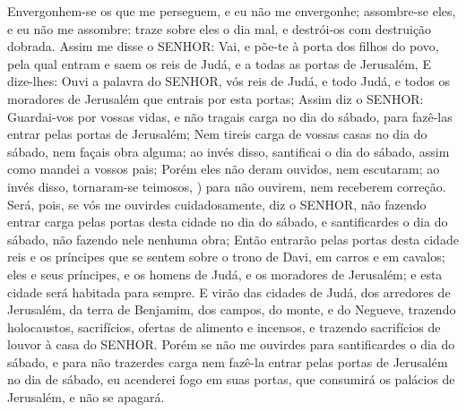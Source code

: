 {Envergonhem-se os que me perseguem, e eu não me envergonhe; assombre-se eles, e eu não me assombre: traze sobre eles o dia mal, e destrói-os com destruição dobrada.
Assim me disse o SENHOR: Vai, e põe-te à porta dos filhos do povo, pela qual entram e saem os reis de Judá, e a todas as portas de Jerusalém,
E dize-lhes: Ouvi a palavra do SENHOR, vós reis de Judá, e todo Judá, e todos os moradores de Jerusalém que entrais por esta portas;
Assim diz o SENHOR: Guardai-vos por vossas vidas,
 e não tragais carga no dia do sábado, para fazê-las entrar pelas portas de Jerusalém;
Nem tireis carga de vossas casas no dia do sábado, nem façais obra alguma; ao invés disso, santificai o dia do sábado, assim como mandei a vossos pais;
Porém eles não deram ouvidos, nem escutaram; ao invés disso, tornaram-se teimosos,
 ) para não ouvirem, nem receberem correção.
Será, pois, se vós me ouvirdes cuidadosamente, diz o SENHOR, não fazendo entrar carga pelas portas desta cidade no dia do sábado, e santificardes o dia do sábado, não fazendo nele nenhuma obra;
Então entrarão pelas portas desta cidade reis e os príncipes que se sentem sobre o trono de Davi,
{} em carros e em cavalos; eles e seus príncipes, e os homens de Judá, e os moradores de Jerusalém; e esta cidade será habitada para sempre.
E
{} virão das cidades de Judá, dos arredores de Jerusalém, da terra de Benjamim, dos campos, do monte, e do Negueve, trazendo holocaustos, sacrifícios, ofertas de alimento e incensos, e trazendo sacrifícios de louvor à casa do SENHOR.
Porém se não me ouvirdes para santificardes o dia do sábado, e para não trazerdes carga nem fazê-la entrar pelas portas de Jerusalém no dia de sábado, eu acenderei fogo em suas portas, que consumirá os palácios de Jerusalém, e não se apagará.

\par }

